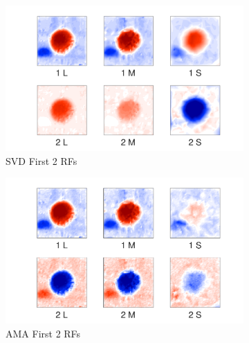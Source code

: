 \documentclass{jov}
\begin{document}
\begin{figure}
\centering
\begin{subfigure}[b]{0.27 \textwidth}
		\centering
        \includegraphics[width=\textwidth]{Figure4/case9SVD.pdf}
        \caption{SVD First 2 RFs}
        \label{fig:case9SVD}
    \end{subfigure}
    \begin{subfigure}[b]{0.27 \textwidth}   
        \includegraphics[width=\textwidth]{Figure4/case9AMA.pdf}
        \caption{AMA First 2 RFs}
        \label{fig:case9AMA}
    \end{subfigure}
        \begin{subfigure}[b]{0.20 \textwidth}

\end{subfigure}
\end{figure}
\end{document}
